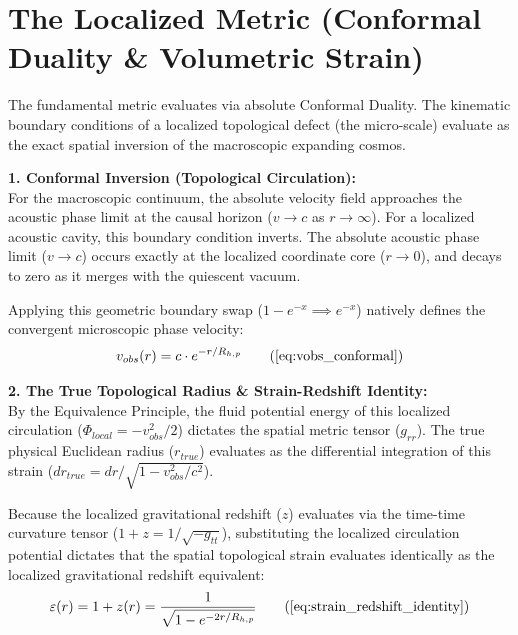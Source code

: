 \documentclass[11pt, a4paper]{article}
\begin{document}
\section{The Localized Metric (Conformal Duality \& Volumetric Strain)}
\label{sec:deriv_localized_metric_strain}

The fundamental metric evaluates via absolute Conformal Duality. The kinematic boundary conditions of a localized topological defect (the micro-scale) evaluate as the exact spatial inversion of the macroscopic expanding cosmos.

\textbf{1. Conformal Inversion (Topological Circulation):} \\
For the macroscopic continuum, the absolute velocity field approaches the acoustic phase limit at the causal horizon ($v \to c$ as $r \to \infty$). For a localized acoustic cavity, this boundary condition inverts. The absolute acoustic phase limit ($v \to c$) occurs exactly at the localized coordinate core ($r \to 0$), and decays to zero as it merges with the quiescent vacuum. 

Applying this geometric boundary swap ($1 - e^{-x} \implies e^{-x}$) natively defines the convergent microscopic phase velocity:
\begin{equation}
    v_{obs}(r) = c \cdot e^{-r/R_{h,p}} \tag{\ref{eq:vobs_conformal}}
\end{equation}

\textbf{2. The True Topological Radius \& Strain-Redshift Identity:} \\
By the Equivalence Principle, the fluid potential energy of this localized circulation ($\Phi_{local} = -v_{obs}^2/2$) dictates the spatial metric tensor ($g_{rr}$). The true physical Euclidean radius ($r_{true}$) evaluates as the differential integration of this strain ($dr_{true} = dr / \sqrt{1 - v_{obs}^2/c^2}$).

Because the localized gravitational redshift ($z$) evaluates via the time-time curvature tensor ($1+z = 1/\sqrt{-g_{tt}}$), substituting the localized circulation potential dictates that the spatial topological strain evaluates identically as the localized gravitational redshift equivalent:
\begin{equation}
    \varepsilon(r) = 1+z(r) = \frac{1}{\sqrt{1 - e^{-2r/R_{h,p}}}} \tag{\ref{eq:strain_redshift_identity}}
\end{equation}
\end{document}
